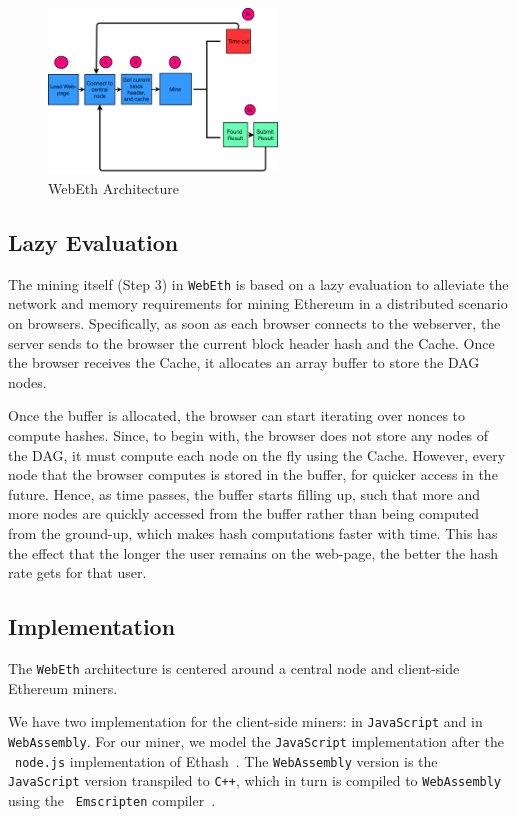 \documentclass[runningheads]{llncs}
\begin{document}
\begin{figure}[h]
\centering
\includegraphics[width=230px,keepaspectratio]{Hybrid-Miner.pdf}
\caption{WebEth Architecture}
\label{fig:hybridArchitecture}
\end{figure}

\subsection{Lazy Evaluation}
The mining itself (Step 3) in \verb|WebEth| is based on a lazy evaluation to alleviate the network and memory requirements for mining Ethereum in a distributed scenario on browsers. Specifically, as soon as each browser connects to the webserver, the server sends to the browser the current block header hash and the Cache. Once the browser receives the Cache, it allocates an array buffer to store the DAG nodes.
 
Once the buffer is allocated, the browser can start iterating over nonces to compute hashes.  
Since, to begin with, the browser does not store any nodes of the DAG, it must compute each node on the fly using the Cache. However, every node that the browser computes is stored in the buffer, for quicker access in the future. Hence, as time passes, the buffer starts filling up, such that more and more nodes are quickly accessed from the buffer rather than being computed from the ground-up, which makes hash computations faster with time. This has the effect that the longer the user remains on the web-page, the better the hash rate gets for that user. 

\subsection{Implementation}

The \verb|WebEth| architecture is centered around a central node and client-side Ethereum miners. 

We have two implementation for the client-side miners: in \verb|JavaScript| and in \verb|WebAssembly|. For our miner, we model the \verb|JavaScript| implementation after the ~\verb|node.js| implementation of Ethash~\cite{ethash}. The \verb|WebAssembly| version is the \verb|JavaScript| version transpiled to \verb|C++|, which in turn is compiled to \verb|WebAssembly| using the ~\verb|Emscripten| compiler~\cite{emscripten}. 
\end{document}
